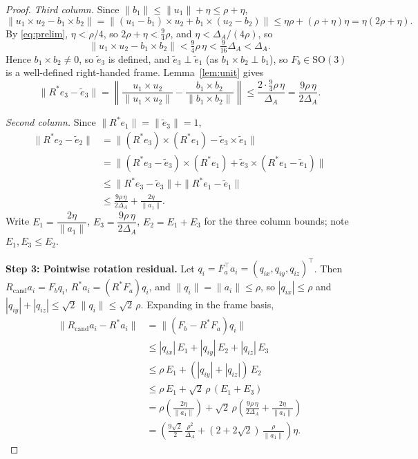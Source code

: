 \documentclass[11pt]{article}
\begin{document}
\begin{proof}
\emph{Third column.} Since $\|b_1\| \le \|u_1\| + \eta \le \rho + \eta$,
\[
\|u_1 \times u_2 - b_1 \times b_2\| = \|(u_1 - b_1) \times u_2 + b_1 \times (u_2 - b_2)\| \le \eta\rho + (\rho + \eta)\eta = \eta(2\rho + \eta).
\]
By \eqref{eq:prelim}, $\eta < \rho/4$, so $2\rho + \eta < \tfrac{9}{4}\rho$, and $\eta < \Delta_A/(4\rho)$, so
\[
\|u_1 \times u_2 - b_1 \times b_2\| < \tfrac{9}{4}\rho\,\eta < \tfrac{9}{16}\Delta_A < \Delta_A.
\]
Hence $b_1 \times b_2 \neq 0$, so $\tilde{e}_3$ is defined, and $\tilde{e}_3 \perp \tilde{e}_1$ (as $b_1 \times b_2 \perp b_1$), so $F_b \in \mathrm{SO}(3)$ is a well-defined right-handed frame. Lemma~\ref{lem:unit} gives
\[
\|R^* e_3 - \tilde{e}_3\| = \left\|\frac{u_1 \times u_2}{\|u_1 \times u_2\|} - \frac{b_1 \times b_2}{\|b_1 \times b_2\|}\right\| \le \frac{2 \cdot \frac{9}{4}\rho\,\eta}{\Delta_A} = \frac{9\rho\,\eta}{2\Delta_A}.
\]

\emph{Second column.} Since $\|R^* e_1\| = \|\tilde{e}_3\| = 1$,
\begin{align*}
\|R^* e_2 - \tilde{e}_2\|
&= \|(R^* e_3) \times (R^* e_1) - \tilde{e}_3 \times \tilde{e}_1\| \\
&= \|(R^* e_3 - \tilde{e}_3) \times (R^* e_1) + \tilde{e}_3 \times (R^* e_1 - \tilde{e}_1)\| \\
&\le \|R^* e_3 - \tilde{e}_3\| + \|R^* e_1 - \tilde{e}_1\| \\
&\le \frac{9\rho\,\eta}{2\Delta_A} + \frac{2\eta}{\|a_1\|}.
\end{align*}
Write $E_1 = \dfrac{2\eta}{\|a_1\|}$, $E_3 = \dfrac{9\rho\,\eta}{2\Delta_A}$, $E_2 = E_1 + E_3$ for the three column bounds; note $E_1, E_3 \le E_2$.

\medskip
\noindent\textbf{Step 3: Pointwise rotation residual.}
Let $q_i = F_a^\top a_i = (q_{ix}, q_{iy}, q_{iz})^\top$. Then $R_{\mathrm{cand}} a_i = F_b q_i$, $R^* a_i = (R^* F_a) q_i$, and $\|q_i\| = \|a_i\| \le \rho$, so $|q_{ix}| \le \rho$ and $|q_{iy}| + |q_{iz}| \le \sqrt{2}\,\|q_i\| \le \sqrt{2}\,\rho$. Expanding in the frame basis,
\begin{align*}
\|R_{\mathrm{cand}} a_i - R^* a_i\|
&= \|(F_b - R^* F_a) q_i\| \\
&\le |q_{ix}|\,E_1 + |q_{iy}|\,E_2 + |q_{iz}|\,E_3 \\
&\le \rho\,E_1 + (|q_{iy}| + |q_{iz}|)\,E_2 \\
&\le \rho\,E_1 + \sqrt{2}\,\rho\,(E_1 + E_3) \\
&= \rho\left(\frac{2\eta}{\|a_1\|}\right) + \sqrt{2}\,\rho\left(\frac{9\rho\,\eta}{2\Delta_A} + \frac{2\eta}{\|a_1\|}\right) \\
&= \left(\frac{9\sqrt{2}}{2}\,\frac{\rho^2}{\Delta_A} + (2 + 2\sqrt{2})\,\frac{\rho}{\|a_1\|}\right)\eta.
\end{align*}


\end{proof}
\end{document}
